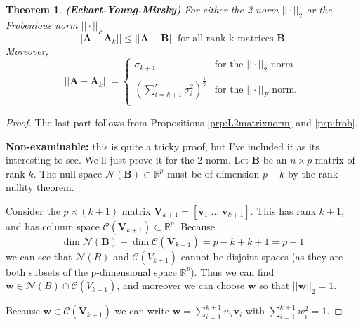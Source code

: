 \documentclass[]{book}
\newtheorem{theorem}{Theorem}[chapter]
\theoremstyle{definition}
\theoremstyle{definition}
\theoremstyle{definition}
\theoremstyle{remark}
\begin{document}
\begin{theorem}
\protect\hypertarget{thm:Eckart-Young}{}{\label{thm:Eckart-Young} }\textbf{(Eckart-Young-Mirsky)} For either the 2-norm \(||\cdot||_2\) or the Frobenious norm \(||\cdot||_F\)
\[||\boldsymbol A-\boldsymbol A_k|| \leq ||\boldsymbol A-\boldsymbol B|| \mbox{ for all rank-k matrices }\boldsymbol B.\]
Moreover,
\[||\boldsymbol A-\boldsymbol A_k|| =\begin{cases}
\sigma_{k+1} &\mbox{for the }||\cdot||_2 \mbox{ norm}\\
\left(\sum_{i=k+1}^r \sigma_{i}^2\right)^{\frac{1}{2}} &\mbox{for the }||\cdot||_F \mbox{ norm.}\\
\end{cases}\]
\end{theorem}

\begin{proof}
{}The last part follows from Propositions \ref{prp:L2matrixnorm} and \ref{prp:frob}.

\textbf{Non-examinable:} this is quite a tricky proof, but I've included it as its interesting to see.
We'll just prove it for the 2-norm.
Let \(\boldsymbol B\) be an \(n\times p\) matrix of rank \(k\). The null space \(\mathcal{N}(\boldsymbol B)\subset\mathbb{R}^p\) must be of dimension \(p-k\) by the rank nullity theorem.

Consider the \(p \times (k+1)\) matrix \(\boldsymbol V_{k+1}=[\boldsymbol v_1\; \ldots \;\boldsymbol v_{k+1}]\). This has rank \(k+1\), and has column space \(\mathcal{C}(\boldsymbol V_{k+1})\subset \mathbb{R}^{p}\). Because
\[\dim \mathcal{N}(\boldsymbol B)+\dim \mathcal{C}(\boldsymbol V_{k+1})=p-k+k+1=p+1\]
we can see that \(\mathcal{N}(B)\) and \(\mathcal{C}(V_{k+1})\) cannot be disjoint spaces (as they are both subsets of the p-dimensional space \(\mathbb{R}^p\)). Thus we can find
\(\boldsymbol w\in \mathcal{N}(B)\cap\mathcal{C}(V_{k+1})\), and moreover we can choose \(\boldsymbol w\) so that \(||\boldsymbol w||_2=1\).

Because \(\boldsymbol w\in \mathcal{C}(\boldsymbol V_{k+1})\) we can write \(\boldsymbol w= \sum_{i=1}^{k+1}w_i \boldsymbol v_i\) with \(\sum_{i=1}^{k+1}w_i^2=1\).


\end{proof}
\end{document}
